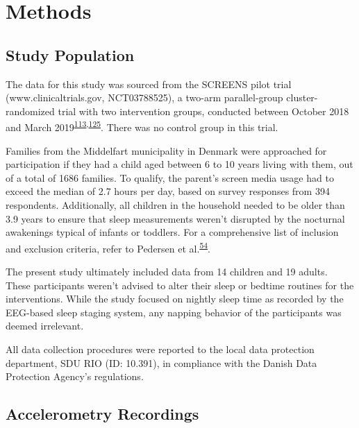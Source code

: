 \documentclass[
  10pt,
]{scrbook}
\begin{document}
\hypertarget{methods}{%
\section{Methods}\label{methods}}

\hypertarget{study-population}{%
\subsection{Study Population}\label{study-population}}

The data for this study was sourced from the SCREENS pilot trial
(www.clinicaltrials.gov, NCT03788525), a two-arm parallel-group
cluster-randomized trial with two intervention groups, conducted between
October 2018 and March
2019\textsuperscript{\protect\hyperlink{ref-rasmussen_short-term_2020}{113},\protect\hyperlink{ref-rasmussen_feasibility_2021}{125}}.
There was no control group in this trial.

Families from the Middelfart municipality in Denmark were approached for
participation if they had a child aged between 6 to 10 years living with
them, out of a total of 1686 families. To qualify, the parent's screen
media usage had to exceed the median of 2.7 hours per day, based on
survey responses from 394 respondents. Additionally, all children in the
household needed to be older than 3.9 years to ensure that sleep
measurements weren't disrupted by the nocturnal awakenings typical of
infants or toddlers. For a comprehensive list of inclusion and exclusion
criteria, refer to Pedersen et
al.\textsuperscript{\protect\hyperlink{ref-pedersen_self-administered_2021}{54}}.

The present study ultimately included data from 14 children and 19
adults. These participants weren't advised to alter their sleep or
bedtime routines for the interventions. While the study focused on
nightly sleep time as recorded by the EEG-based sleep staging system,
any napping behavior of the participants was deemed irrelevant.

All data collection procedures were reported to the local data
protection department, SDU RIO (ID: 10.391), in compliance with the
Danish Data Protection Agency's regulations.

\hypertarget{accelerometry-recordings}{%
\subsection{Accelerometry Recordings}\label{accelerometry-recordings}}
\end{document}
